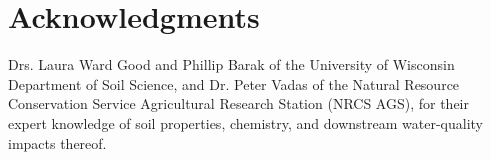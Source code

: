 \section{Acknowledgments}
Drs. Laura Ward Good and Phillip Barak of the University of Wisconsin Department of Soil Science, and Dr. Peter Vadas of the Natural Resource Conservation Service Agricultural Research Station (NRCS AGS), for their expert knowledge of soil properties, chemistry, and downstream water-quality impacts thereof.

\pagebreak